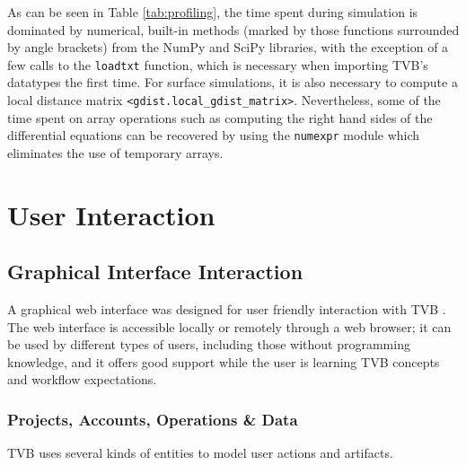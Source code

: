 \documentclass{bioinfo}
\begin{document}
	As can be seen in Table \ref{tab:profiling}, the time spent during simulation
	is dominated by numerical, built-in methods (marked by those functions surrounded by angle
	brackets) from the NumPy and SciPy libraries, with the exception of a few
	calls to the \texttt{loadtxt} function, which is necessary when importing TVB's
	datatypes the first time. For surface simulations, it is also necessary to compute
	a local distance matrix \texttt{<gdist.local\_gdist\_matrix>}. Nevertheless, 
	some of the time spent on array operations such as computing the right hand sides 
	of the differential equations can be 
	recovered by using the \texttt{numexpr} module which eliminates the 
	use of temporary arrays. 


%	

\section{User Interaction}

\subsection{Graphical Interface Interaction}

		A graphical web interface was designed for user friendly
		interaction with TVB . The web interface is accessible locally or
		remotely through a web browser; it can be used by different types of
		users, including those without programming knowledge, and it offers
		good support while the user is learning TVB concepts and workflow
		expectations.  

		\subsubsection{Projects, Accounts, Operations \& Data}

		TVB uses several kinds of entities to model user actions
        and artifacts.
\end{document}
